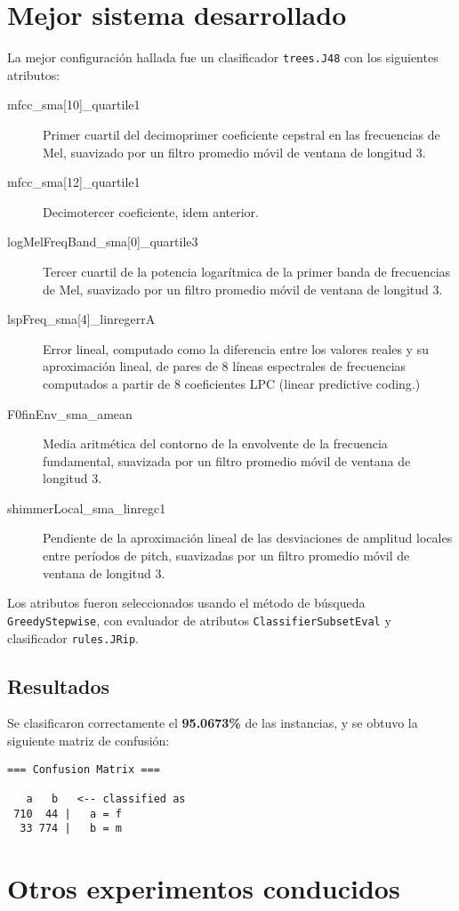 \documentclass[10pt,a4paper]{article}
\begin{document}
\section{Mejor sistema desarrollado}

La mejor configuración hallada fue un clasificador \texttt{trees.J48} con los siguientes atributos:

\begin{description}
\item[mfcc\_sma{[}10{]}\_quartile1] Primer cuartil del decimoprimer coeficiente cepstral en las frecuencias de Mel, suavizado por un filtro promedio móvil de ventana de longitud 3.
\item[mfcc\_sma{[}12{]}\_quartile1] Decimotercer coeficiente, idem anterior.
\item[logMelFreqBand\_sma{[}0{]}\_quartile3] Tercer cuartil de la potencia logarítmica de la primer banda de frecuencias de Mel, suavizado por un filtro promedio móvil de ventana de longitud 3.
\item[lspFreq\_sma{[}4{]}\_linregerrA] Error lineal, computado como la diferencia entre los valores reales y su aproximación lineal, de pares de 8 líneas espectrales de frecuencias computados a partir de 8 coeficientes LPC (linear predictive coding.)
\item[F0finEnv\_sma\_amean] Media aritmética del contorno de la envolvente de la frecuencia fundamental, suavizada por un filtro promedio móvil de ventana de longitud 3.
\item[shimmerLocal\_sma\_linregc1] Pendiente de la aproximación lineal de las desviaciones de amplitud locales entre períodos de pitch, suavizadas por un filtro promedio móvil de ventana de longitud 3.
\end{description}

Los atributos fueron seleccionados usando el método de búsqueda \texttt{GreedyStepwise}, con evaluador de atributos \texttt{ClassifierSubsetEval} y clasificador \texttt{rules.JRip}.

\subsection{Resultados}

Se clasificaron correctamente el \textbf{95.0673\%} de las instancias, y se obtuvo la siguiente matriz de confusión:

\begin{verbatim}
=== Confusion Matrix ===

   a   b   <-- classified as
 710  44 |   a = f
  33 774 |   b = m
\end{verbatim}

\section{Otros experimentos conducidos}

\lipsum[1-3]
\end{document}
